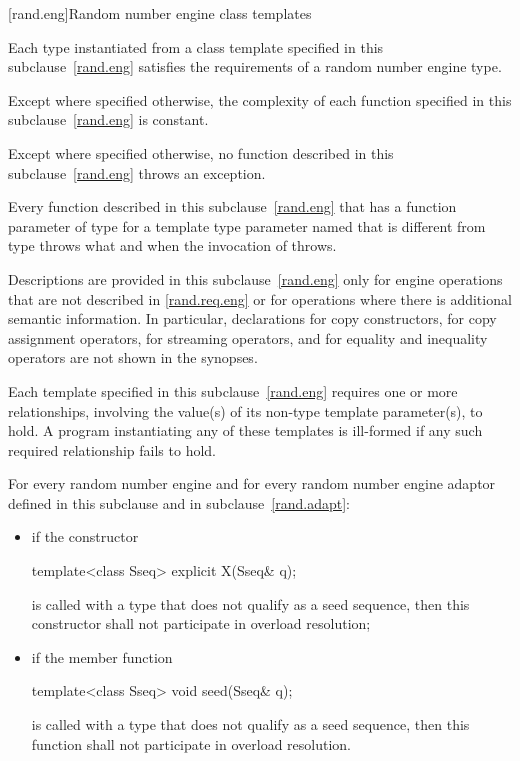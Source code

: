 [rand.eng]{Random number engine class templates}%

\pnum
Each type instantiated
from a class template specified in this subclause~\ref{rand.eng}
satisfies the requirements
of a random number engine type.

\pnum
Except where specified otherwise,
the complexity of each function
specified in this subclause~\ref{rand.eng}
is constant.

\pnum
Except where specified otherwise,
no function described in this subclause~\ref{rand.eng}
throws an exception.

\pnum
Every function described in this subclause~\ref{rand.eng}
that has a function parameter  of type 
for a template type parameter named 
that is different from type 
throws what and when the invocation of  throws.

\pnum
Descriptions are provided in this subclause~\ref{rand.eng}
only for engine operations
that are not described in \ref{rand.req.eng}
or for operations where there is additional semantic information.
In particular,
declarations for copy constructors,
for copy assignment operators,
for streaming operators,
and for equality and inequality operators
are not shown in the synopses.

\pnum
Each template specified in this subclause~\ref{rand.eng}
requires one or more relationships,
involving the value(s) of its non-type template parameter(s), to hold.
A program instantiating any of these templates
is ill-formed
if any such required relationship fails to hold.

\pnum
For every random number engine and for every random number engine adaptor 
defined in this subclause and in subclause~\ref{rand.adapt}:

\begin{itemize}
\item
if the constructor
\begin{codeblock}
template<class Sseq> explicit X(Sseq& q);
\end{codeblock}
is called with a type  that does not qualify as a seed sequence, then this
constructor shall not participate in overload resolution;

\item
if the member function
\begin{codeblock}
template<class Sseq> void seed(Sseq& q);
\end{codeblock}
is called with a type  that does not qualify as a seed sequence, then this
function shall not participate in overload resolution.
\end{itemize}

